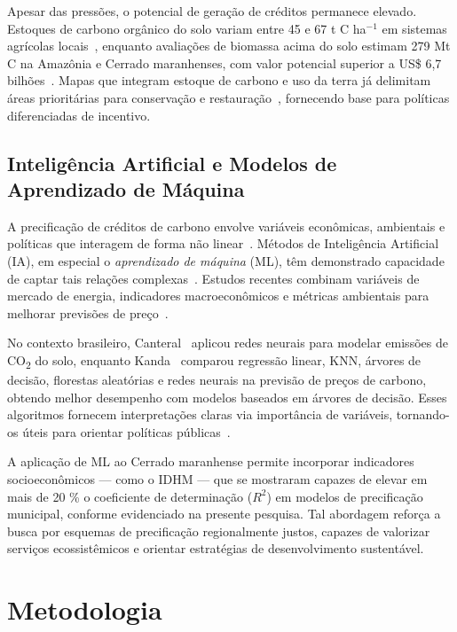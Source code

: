 \documentclass[conference]{IEEEtran}
\begin{document}
Apesar das pressões, o potencial de geração de créditos permanece elevado.  Estoques de carbono orgânico do solo variam entre 45 e 67 t C ha\(^{-1}\) em sistemas agrícolas locais~\cite{gomes2023}, enquanto avaliações de biomassa acima do solo estimam 279 Mt C na Amazônia e Cerrado maranhenses, com valor potencial superior a US\$ 6,7 bilhões~\cite{silvajunior2024}.  Mapas que integram estoque de carbono e uso da terra já delimitam áreas prioritárias para conservação e restauração~\cite{ferraz2023}, fornecendo base para políticas diferenciadas de incentivo.

\subsection{Inteligência Artificial e Modelos de Aprendizado de Máquina}\label{sec:ai}

A precificação de créditos de carbono envolve variáveis econômicas, ambientais e políticas que interagem de forma não linear~\cite{zhou2019}.  Métodos de Inteligência Artificial (IA), em especial o \emph{aprendizado de máquina} (ML), têm demonstrado capacidade de captar tais relações complexas~\cite{zaki2020datamining,maryoosh2022review}.  Estudos recentes combinam variáveis de mercado de energia, indicadores macroeconômicos e métricas ambientais para melhorar previsões de preço~\cite{energyecon2018}.  

No contexto brasileiro, Canteral~\cite{canteral2020} aplicou redes neurais para modelar emissões de CO\textsubscript{2} do solo, enquanto Kanda~\cite{kanda2023} comparou regressão linear, KNN, árvores de decisão, florestas aleatórias e redes neurais na previsão de preços de carbono, obtendo melhor desempenho com modelos baseados em árvores de decisão.  Esses algoritmos fornecem interpretações claras via importância de variáveis, tornando-os úteis para orientar políticas públicas~\cite{facelli2011}.

A aplicação de ML ao Cerrado maranhense permite incorporar indicadores socioeconômicos — como o IDHM — que se mostraram capazes de elevar em mais de 20 \% o coeficiente de determinação ($R^{2}$) em modelos de precificação municipal, conforme evidenciado na presente pesquisa.  Tal abordagem reforça a busca por esquemas de precificação regionalmente justos, capazes de valorizar serviços ecossistêmicos e orientar estratégias de desenvolvimento sustentável.


\section{Metodologia}\label{sec:metod}
\end{document}
